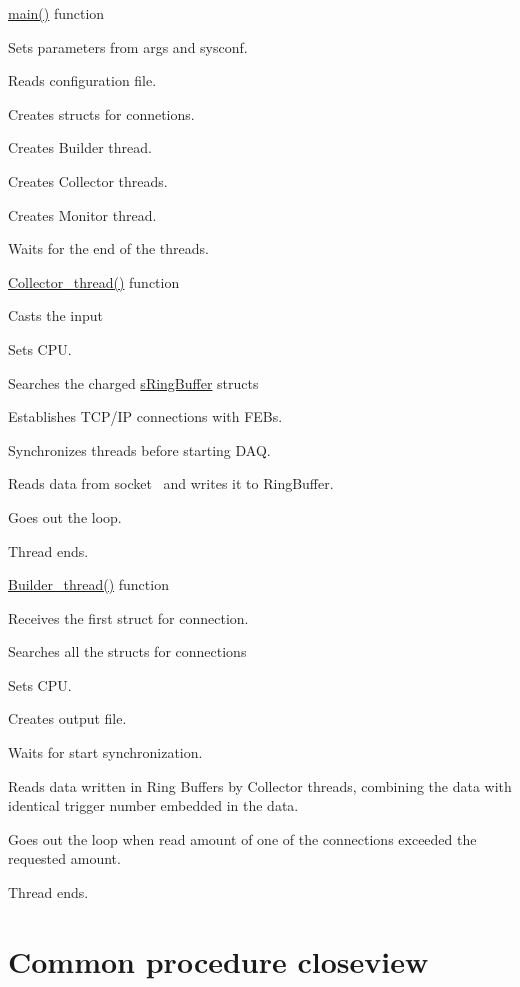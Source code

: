 \begin{DoxyItemize}
\item \hyperlink{_master_8cpp_a3c04138a5bfe5d72780bb7e82a18e627}{main()} function
\begin{DoxyItemize}
\item Sets parameters from args and sysconf.
\item Reads configuration file.
\item Creates structs for connetions.
\item Creates Builder thread.
\item Creates Collector threads.
\item Creates Monitor thread.
\item Waits for the end of the threads.
\end{DoxyItemize}
\item \hyperlink{_master_8cpp_a568c34b708bcc89579bda6142733110a}{Collector\+\_\+thread()} function
\begin{DoxyItemize}
\item Casts the input
\item Sets C\+P\+U.
\item Searches the charged \hyperlink{structs_ring_buffer}{s\+Ring\+Buffer} structs
\item Establishes T\+C\+P/\+I\+P connections with F\+E\+Bs.
\item Synchronizes threads before starting D\+A\+Q.
\item Reads data from socket~\newline
 and writes it to Ring\+Buffer.
\item Goes out the loop.
\item Thread ends.
\end{DoxyItemize}
\item \hyperlink{_master_8cpp_a435b26afa480ba18cbef3620d0eccee2}{Builder\+\_\+thread()} function
\begin{DoxyItemize}
\item Receives the first struct for connection.
\item Searches all the structs for connections
\item Sets C\+P\+U.
\item Creates output file.
\item Waits for start synchronization.
\item Reads data written in Ring Buffers by Collector threads, combining the data with identical trigger number embedded in the data.
\item Goes out the loop when read amount of one of the connections exceeded the requested amount.
\item Thread ends.
\end{DoxyItemize}
\end{DoxyItemize}\hypertarget{index_PROCEDURE_CLOSEVIEW}{}\section{Common procedure closeview}\label{index_PROCEDURE_CLOSEVIEW}
